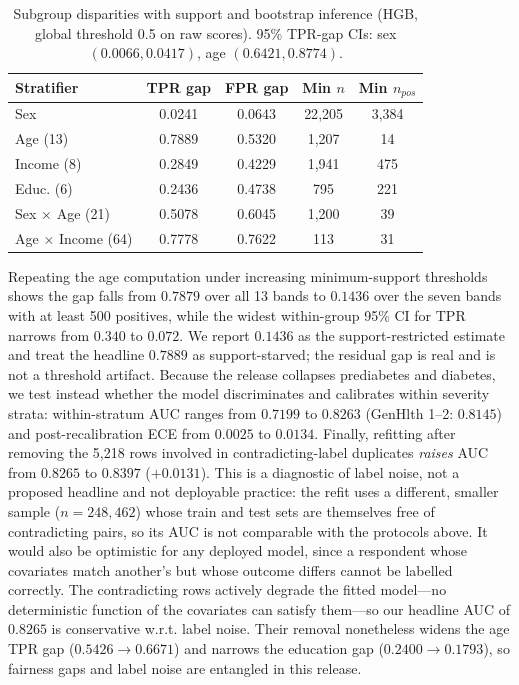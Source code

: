 \documentclass[conference]{IEEEtran}
\begin{document}
\begin{table}[!t]
\caption{Subgroup disparities with support and bootstrap inference (HGB, global threshold 0.5 on raw scores). 95\% TPR-gap CIs: sex $(0.0066, 0.0417)$, age $(0.6421, 0.8774)$.}
\label{tab:fair}
\centering
\footnotesize
\begin{tabular}{lcccc}
\toprule
Stratifier & TPR gap & FPR gap & Min $n$ & Min $n_{pos}$ \\
\midrule
Sex & 0.0241 & 0.0643 & 22{,}205 & 3{,}384 \\
Age (13) & 0.7889 & 0.5320 & 1{,}207 & 14 \\
Income (8) & 0.2849 & 0.4229 & 1{,}941 & 475 \\
Educ. (6) & 0.2436 & 0.4738 & 795 & 221 \\
Sex $\times$ Age (21) & 0.5078 & 0.6045 & 1{,}200 & 39 \\
Age $\times$ Income (64) & 0.7778 & 0.7622 & 113 & 31 \\
\bottomrule
\end{tabular}
\end{table}

Repeating the age computation under increasing minimum-support thresholds shows the gap falls from $0.7879$ over all 13 bands to $0.1436$ over the seven bands with at least 500 positives, while the widest within-group 95\% CI for TPR narrows from $0.340$ to $0.072$. We report $0.1436$ as the support-restricted estimate and treat the headline $0.7889$ as support-starved; the residual gap is real and is not a threshold artifact. Because the release collapses prediabetes and diabetes, we test instead whether the model discriminates and calibrates within severity strata: within-stratum AUC ranges from $0.7199$ to $0.8263$ (GenHlth 1--2: $0.8145$) and post-recalibration ECE from $0.0025$ to $0.0134$. Finally, refitting after removing the 5{,}218 rows involved in contradicting-label duplicates \emph{raises} AUC from $0.8265$ to $0.8397$ ($+0.0131$). This is a diagnostic of label noise, not a proposed headline and not deployable practice: the refit uses a different, smaller sample ($n = 248{,}462$) whose train and test sets are themselves free of contradicting pairs, so its AUC is not comparable with the protocols above. It would also be optimistic for any deployed model, since a respondent whose covariates match another's but whose outcome differs cannot be labelled correctly. The contradicting rows actively degrade the fitted model---no deterministic function of the covariates can satisfy them---so our headline AUC of $0.8265$ is conservative w.r.t. label noise. Their removal nonetheless widens the age TPR gap ($0.5426 \rightarrow 0.6671$) and narrows the education gap ($0.2400 \rightarrow 0.1793$), so fairness gaps and label noise are entangled in this release.
\end{document}
